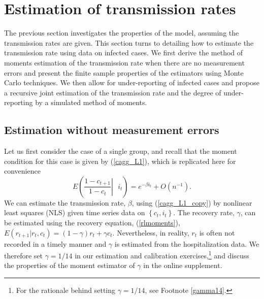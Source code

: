 \documentclass[12pt]{article}
\begin{document}
\section{Estimation of transmission rates \label{Sec: estimation R}}

The previous section investigates the properties of the model, assuming the
transmission rates are given. This section turns to detailing how to estimate
the transmission rate using data on infected cases. We first derive the method
of moments estimation of the transmission rate when there are no measurement
errors and present the finite sample properties of the estimators using Monte
Carlo techniques. We then allow for under-reporting of infected cases and
propose a recursive joint estimation of the transmission rate and the degree
of under-reporting by a simulated method of moments.

\subsection{Estimation without measurement
errors\label{Sec: estimation R no errors}}

Let us first consider the case of a single group, and recall that the moment
condition for this case is given by (\ref{cagg_L1}), which is replicated here
for convenience%
\begin{equation}
E\left(  \left.  \frac{1-c_{t+1}}{1-c_{t}}\right\vert \text{ }i_{t}\right)
=e^{-\beta i_{t}}+O\left(  n^{-1}\right)  . \label{cagg_L1_copy}%
\end{equation}
We can estimate the transmission rate, $\beta$, using (\ref{cagg_L1_copy}) by
nonlinear least squares (NLS) given time series data on $\left\{  c_{t}%
,i_{t}\right\}  $. The recovery rate, $\gamma$, can be estimated using the
recovery equation, (\ref{rlmoments}), $E\left(  r_{t+1}|r_{t},c_{t}\right)
=\left(  1-\gamma\right)  r_{t}+\gamma c_{t}$. Nevertheless, in reality,
$r_{t}$ is often not recorded in a timely manner and $\gamma$ is estimated
from the hospitalization data. We therefore set $\gamma=1/14$ in our
estimation and calibration exercises,\footnote{For the rationale behind
setting $\gamma=1/14$, see Footnote \ref{gamma14}.} and discuss the properties
of the moment estimator of $\gamma$ in the online supplement.
\end{document}
